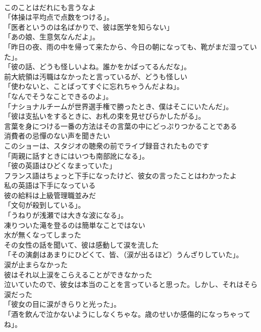 \documentclass[8pt]{extreport}
\begin{document}
\begin{CJK}{UTF8}{min}
\\	このことはだれにも言うなよ	
\\	「体操は平均点で点数をつける」。	
\\	「医者というのは名ばかりで、彼は医学を知らない」	
\\	「あの娘、生意気なんだよ」。	
\\	「昨日の夜、雨の中を帰って来たから、今日の朝になっても、靴がまだ湿っていた」。	
\\	「彼の話、どうも怪しいよね。誰かをかばってるんだな」。	
\\	前大統領は汚職はなかったと言っているが、どうも怪しい	
\\	「使わないと、ことばってすぐに忘れちゃうんだよね」。	
\\	「なんでそうなことできるのよ」。	
\\	「ナショナルチームが世界選手権で勝ったとき、僕はそこにいたんだ」。	
\\	「彼は支払いをするときに、お札の束を見せびらかしたがる」。	
\\	言葉を身につける一番の方法はその言葉の中にどっぷりつかることである	
\\	消費者の忌憚のない声を聞きたい	
\\	このショーは、スタジオの聴衆の前でライブ録音されたものです	
\\	「両親に話すときにはいつも南部訛になる」。	
\\	「彼の英語はひどくなまっていた」	
\\	フランス語はちょっと下手になったけど、彼女の言ったことはわかったよ	
\\	私の英語は下手になっている	
\\	彼の給料は上級管理職並みだ	
\\	「文句が殺到している」。	
\\	「うねりが浅瀬では大きな波になる」。	
\\	凍りついた滝を登るのは簡単なことではない	
\\	水が無くなってしまった	
\\	その女性の話を聞いて、彼は感動して涙を流した	
\\	「その演劇はあまりにひどくて、皆、（涙が出るほど）うんざりしていた」。	
\\	涙が止まらなかった	
\\	彼はそれ以上涙をこらえることができなかった	
\\	泣いていたので、彼女は本当のことを言っていると思った。しかし、それはそら涙だった	
\\	「彼女の目に涙がきらりと光った」。	
\\	「酒を飲んで泣かないようにしなくちゃな。歳のせいか感傷的になっちゃってね」。	

\end{CJK}
\end{document}
